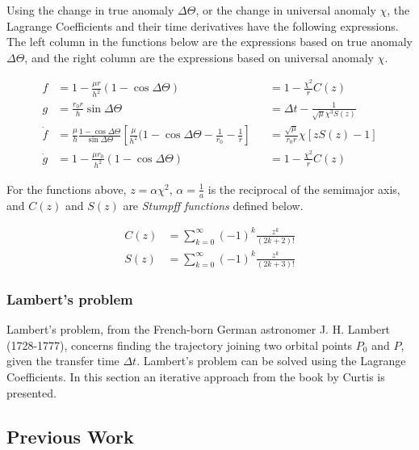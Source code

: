 Using the change in true anomaly $\Delta \Theta$, or the change in universal anomaly $\chi$, the Lagrange Coefficients and their time derivatives have the following expressions. The left column in the functions below are the expressions based on true anomaly $\Delta \Theta$, and the right column are the expressions based on universal anomaly $\chi$.

\begin{align}
    f &= 1 - \frac{ \mu r }{ h^2 } ( 1 - \cos{\Delta \Theta} ) &&= 1 - \frac{\chi^2}{r} C(z)
    \label{eq:lagrange_anomaly_f} \\
    g  &= \frac{ r_0 r }{ h } \sin{\Delta \Theta} &&= \Delta t - \frac{1}{\sqrt{\mu} \chi^3 S( z )}
    \label{eq:lagrange_anomaly_g} \\
    \dot{f} &= \frac{\mu}{h} \frac{1 - \cos{\Delta \Theta}}{\sin{\Delta \Theta}} [ \frac{\mu}{h^2} (1 - \cos{\Delta \Theta} - \frac{1}{r_0} - \frac{1}{r} ] &&= \frac{\sqrt{\mu}}{r_0 r} \chi [z S(z) - 1]
    \label{eq:lagrange_anomaly_f_dot} \\
    \dot{g} &= 1 - \frac{\mu r_0}{h^2} (1 - \cos{\Delta \Theta} ) &&= 1 - \frac{\chi^2}{r} C(z)
    \label{eq:lagrange_anomaly_g_dot}
\end{align}

For the functions above, $z = \alpha \chi^2$, $\alpha = \frac{1}{a}$ is the reciprocal of the semimajor axis, and $C(z)$ and $S(z)$ are \textit{Stumpff functions} defined below.

\begin{align}
    C(z) &= \sum_{k = 0}^{\infty} (-1)^k \frac{z^k}{(2k + 2)!} \\
    S(z) &= \sum_{k = 0}^{\infty} (-1)^k \frac{z^k}{(2k + 3)!}
\end{align}{}

\subsubsection{Lambert's problem}

Lambert's problem, from the French-born German astronomer J. H. Lambert (1728-1777), concerns finding the trajectory joining two orbital points $P_0$ and $P$, given the transfer time $\Delta t$. Lambert's problem can be solved using the Lagrange Coefficients. In this section an iterative approach from the book by Curtis \cite{Curtis2009} is presented.











\subsection{Previous Work}

